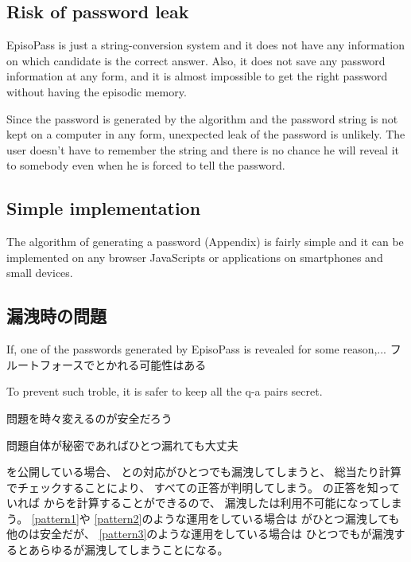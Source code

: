 \documentclass{article}
\begin{document}

\subsection{Risk of password leak}

EpisoPass is just a string-conversion system and it does not
have any information on which candidate is the correct answer.
Also, it does not save any password information at any form, and
it is almost impossible to get the right password 
without having the episodic memory.


Since the password is generated by the algorithm and the password
string is not kept on a computer in any form,
unexpected leak of the password is unlikely.
The user doesn't have to remember the string and
there is no chance he will reveal it to somebody
even when he is forced to tell the password.


\subsection{Simple implementation}

The algorithm of generating a password (Appendix)
is fairly simple and
it can be implemented on any browser JavaScripts or
applications on smartphones and small devices.

\subsection{{\PW}漏洩時の問題}

If, one of the passwords generated by EpisoPass is revealed
for some reason,... フルートフォースでとかれる可能性はある

To prevent such troble, it is safer to keep all the q-a pairs secret.

問題を時々変えるのが安全だろう

問題自体が秘密であればひとつ漏れても大丈夫

{\SQ}を公開している場合、
{\SS}と{\PW}の対応がひとつでも漏洩してしまうと、
総当たり計算でチェックすることにより、
すべて{\SQ}の正答が判明してしまう。
{\SQ}の正答を知っていれば
{\SS}から{\PW}を計算することができるので、
漏洩した{\SQ}は利用不可能になってしまう。
%
\ref{pattern1}や
\ref{pattern2}のような運用をしている場合は
{\PW}がひとつ漏洩しても他の{\PW}は安全だが、
\ref{pattern3}のような運用をしている場合は
ひとつでも{\PW}が漏洩するとあらゆる{\PW}が漏洩してしまうことになる。
\end{document}
